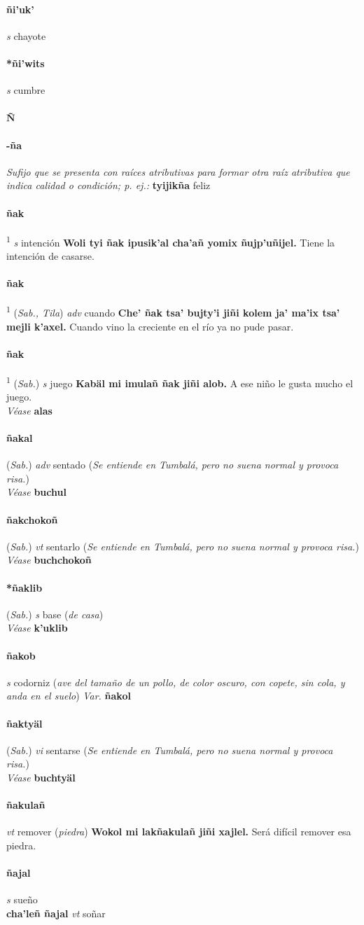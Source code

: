\documentclass{scrbook}
\newcommand{\entry}[1]{\paragraph{#1}}
\newcommand{\alphaletter}[1]{\addsec{#1}}
\newcommand{\defsuperscript}[1]{\textsuperscript{1}}
\newcommand{\nontranslationdef}[1]{\textit{#1}}
\newcommand{\partofspeech}[1]{\textit{#1}}
\newcommand{\spanishtranslation}[1]{#1}
\newcommand{\clarification}[1]{(\textit{#1})}
\newcommand{\cholexample}[1]{\textbf{#1}}
\newcommand{\exampletranslation}[1]{#1}
\newcommand{\alsosee}[1]{\\\textit{Véase} \textbf{#1}}
\newcommand{\relevantdialect}[1]{(\textit{#1})}
\newcommand{\secondaryentry}[1]{\\\textbf{#1}}
\newcommand{\secondpartofspeech}[1]{\textit{#1}}
\newcommand{\secondtranslation}[1]{#1}
\newcommand{\variation}[1]{\textit{Var.} \textbf{#1}}
\begin{document}
\begin{multicols}{2}
\entry{ñi'uk'}
\partofspeech{s}
\spanishtranslation{chayote}

\entry{*ñi'wits}
\partofspeech{s}
\spanishtranslation{cumbre}

\entry{Ñ}
\alphaletter{Ñ}

\entry{-ña}
\nontranslationdef{Sufijo que se presenta con raíces atributivas para formar otra raíz atributiva que indica calidad o condición; p. ej.:}
\cholexample{tyijikña}
\exampletranslation{feliz}

\entry{ñak}
\defsuperscript{1}
\partofspeech{s}
\spanishtranslation{intención}
\cholexample{Woli tyi ñak ipusik'al cha'añ yomix ñujp'uñijel.}
\exampletranslation{Tiene la intención de casarse.}

\entry{ñak}
\defsuperscript{3}
\relevantdialect{Sab., Tila}
\partofspeech{adv}
\spanishtranslation{cuando}
\cholexample{Che' ñak tsa' bujty'i jiñi kolem ja' ma'ix tsa' mejli k'axel.}
\exampletranslation{Cuando vino la creciente en el río ya no pude pasar.}

\entry{ñak}
\defsuperscript{2}
\relevantdialect{Sab.}
\partofspeech{s}
\spanishtranslation{juego}
\cholexample{Kabäl mi imulañ ñak jiñi alob.}
\exampletranslation{A ese niño le gusta mucho el juego.}
\alsosee{alas}

\entry{ñakal}
\relevantdialect{Sab.}
\partofspeech{adv}
\spanishtranslation{sentado}
\clarification{Se entiende en Tumbalá, pero no suena normal y provoca risa.}
\alsosee{buchul}

\entry{ñakchokoñ}
\relevantdialect{Sab.}
\partofspeech{vt}
\spanishtranslation{sentarlo}
\clarification{Se entiende en Tumbalá, pero no suena normal y provoca risa.}
\alsosee{buchchokoñ}

\entry{*ñaklib}
\relevantdialect{Sab.}
\partofspeech{s}
\spanishtranslation{base}
\clarification{de casa}
\alsosee{k'uklib}

\entry{ñakob}
\partofspeech{s}
\spanishtranslation{codorniz}
\clarification{ave del tamaño de un pollo, de color oscuro, con copete, sin cola, y anda en el suelo}
\variation{ñakol}

\entry{ñaktyäl}
\relevantdialect{Sab.}
\partofspeech{vi}
\spanishtranslation{sentarse}
\clarification{Se entiende en Tumbalá, pero no suena normal y provoca risa.}
\alsosee{buchtyäl}

\entry{ñakulañ}
\partofspeech{vt}
\spanishtranslation{remover}
\clarification{piedra}
\cholexample{Wokol mi lakñakulañ jiñi xajlel.}
\exampletranslation{Será difícil remover esa piedra.}

\entry{ñajal}
\partofspeech{s}
\spanishtranslation{sueño}
\secondaryentry{cha'leñ ñajal}
\secondpartofspeech{vt}
\secondtranslation{soñar}


\end{multicols}
\end{document}
